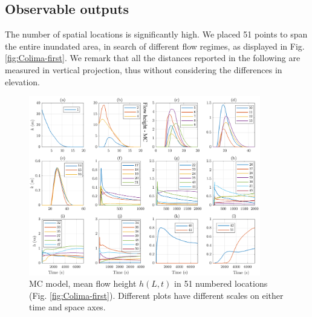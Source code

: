 \documentclass{article}
\begin{document}
\subsection{Observable outputs}
The number of spatial locations is significantly high. We placed 51 points to span the entire inundated area, in search of different flow regimes, as displayed in Fig. \ref{fig:Colima-first}. We remark that all the distances reported in the following are measured in vertical projection, thus without considering the differences in elevation.
\begin{figure}[H]
         \centering
        \includegraphics[width=0.9\textwidth]{figures/Colima/HeightMC_BAF.png}
        \caption{MC model, mean flow height $h(L,t)$ in 51 numbered locations (Fig. \ref{fig:Colima-first}). Different plots have different scales on either time and space axes.}
        \label{fig:BAF-H-MC}
\end{figure}
\end{document}
